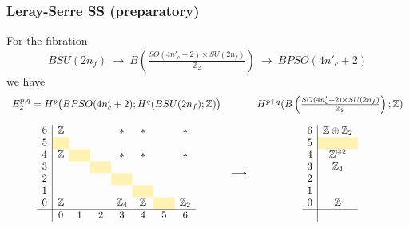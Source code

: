 \documentclass[12pt]{article}
\numberwithin{equation}{section}
\def\bZ{\mathbb{Z}}
\begin{document}
\subsubsection{Leray-Serre SS (preparatory)}
For the fibration
\begin{equation}
	BSU(2n_f)
	\ \to\ 
	B\left(\tfrac{SO(4n'_c+2)\times SU(2n_f)}{\bZ_2}\right)
	\ \to\ 
	BPSO(4n'_c+2)
\end{equation}
we have
\begin{equation}
	\begin{array}{ccc}
		E_2^{p,q}=H^p\big(BPSO(4n'_c+2);H^q(BSU(2n_f);\bZ)\big) && H^{p+q}(B\left(\tfrac{SO(4n'_c+2)\times SU(2n_f)}{\bZ_2}\right);\bZ)\vspace{4mm}\\
		\begin{array}{c|ccccccccccccc}
			6  & \bZ &&& \ast & \ast && \ast\\
			5  & \cellcolor{lightyellow} & \hphantom{\bZ_2} & \hphantom{\bZ_2} & \hphantom{\bZ_2} & \hphantom{\bZ_2} & \hphantom{\bZ_2} \\
			4  & \bZ & \cellcolor{lightyellow} && \ast & \ast & & \ast\\
			3  &  && \cellcolor{lightyellow} &&&\\
			2  &&  && \cellcolor{lightyellow} &&\\
			1  &  &&  && \cellcolor{lightyellow} &&\\
			0 & \bZ &  && \bZ_4 & \bZ & \cellcolor{lightyellow} & \bZ_2\\
			\hline
			& 0 & 1 & 2 & 3 & 4 & 5 & 6 \\
		\end{array}
		& \longrightarrow & 
		\begin{array}{c|c}
			6  & \bZ\oplus \bZ_2\\
			5  & \cellcolor{lightyellow}\\
			4  & \bZ^{\oplus 2}\\
			3  & \bZ_4\\
			2  & \\
			1  & \\
			0 & \bZ\\
			\hline\\
		\end{array}
	\end{array}
\end{equation}
\end{document}

